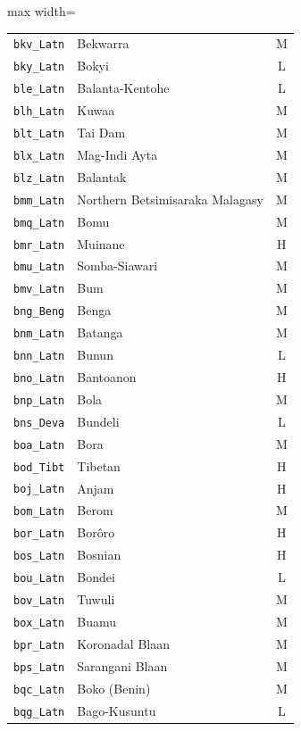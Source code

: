 {\begin{adjustbox}{max width=\textwidth}
\begin{tabular}{llc}
        \texttt{bkv\_Latn} & Bekwarra & M \\
        \texttt{bky\_Latn} & Bokyi & L \\
        \texttt{ble\_Latn} & Balanta-Kentohe & L \\
        \texttt{blh\_Latn} & Kuwaa & M \\
        \texttt{blt\_Latn} & Tai Dam & M \\
        \texttt{blx\_Latn} & Mag-Indi Ayta & M \\
        \texttt{blz\_Latn} & Balantak & M \\
        \texttt{bmm\_Latn} & Northern Betsimisaraka Malagasy & M \\
        \texttt{bmq\_Latn} & Bomu & M \\
        \texttt{bmr\_Latn} & Muinane & H \\
        \texttt{bmu\_Latn} & Somba-Siawari & M \\
        \texttt{bmv\_Latn} & Bum & M \\
        \texttt{bng\_Beng} & Benga & M \\
        \texttt{bnm\_Latn} & Batanga & M \\
        \texttt{bnn\_Latn} & Bunun & L \\
        \texttt{bno\_Latn} & Bantoanon & H \\
        \texttt{bnp\_Latn} & Bola & M \\
        \texttt{bns\_Deva} & Bundeli & L \\
        \texttt{boa\_Latn} & Bora & M \\
        \texttt{bod\_Tibt} & Tibetan & H \\
        \texttt{boj\_Latn} & Anjam & H \\
        \texttt{bom\_Latn} & Berom & M \\
        \texttt{bor\_Latn} & Borôro & H \\
        \texttt{bos\_Latn} & Bosnian & H \\
        \texttt{bou\_Latn} & Bondei & L \\
        \texttt{bov\_Latn} & Tuwuli & M \\
        \texttt{box\_Latn} & Buamu & M \\
        \texttt{bpr\_Latn} & Koronadal Blaan & M \\
        \texttt{bps\_Latn} & Sarangani Blaan & M \\
        \texttt{bqc\_Latn} & Boko (Benin) & M \\
        \texttt{bqg\_Latn} & Bago-Kusuntu & L \\

\end{tabular}
\end{adjustbox}}
